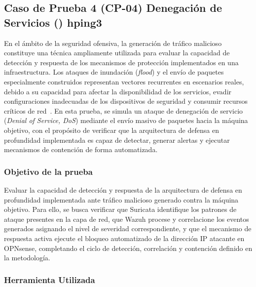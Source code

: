 
\subsection{Caso de Prueba 4 (CP-04) Denegación de Servicios (\DoS) hping3}
\noindent

En el ámbito de la seguridad ofensiva, la generación de tráfico malicioso constituye una técnica ampliamente utilizada para evaluar la 
capacidad de detección y respuesta de los mecanismos de protección implementados en una infraestructura. Los ataques de inundación 
(\textit{flood}) y el envío de paquetes especialmente construidos representan vectores recurrentes en escenarios reales, debido a su 
capacidad para afectar la disponibilidad de los servicios, evadir configuraciones inadecuadas de los dispositivos de seguridad y 
consumir recursos críticos de red~\cite{MITREATTACK2026}. En esta prueba, se simula un ataque de denegación de servicio 
(\textit{Denial of Service, DoS}) mediante el envío masivo de paquetes hacia la máquina objetivo, con el propósito de verificar que la 
arquitectura de defensa en profundidad implementada es capaz de detectar, generar alertas y ejecutar mecanismos de contención de forma 
automatizada.

\subsubsection{Objetivo de la prueba}
\noindent

Evaluar la capacidad de detección y respuesta de la arquitectura de defensa en profundidad implementada ante tráfico malicioso generado 
contra la máquina objetivo. Para ello, se busca verificar que Suricata identifique los patrones de ataque presentes en la capa de red, 
que Wazuh procese y correlacione los eventos generados asignando el nivel de severidad correspondiente, y que el mecanismo de respuesta 
activa ejecute el bloqueo automatizado de la dirección IP atacante en OPNsense, completando el ciclo de detección, correlación y 
contención definido en la metodología.

\subsubsection{Herramienta Utilizada}
\noindent


